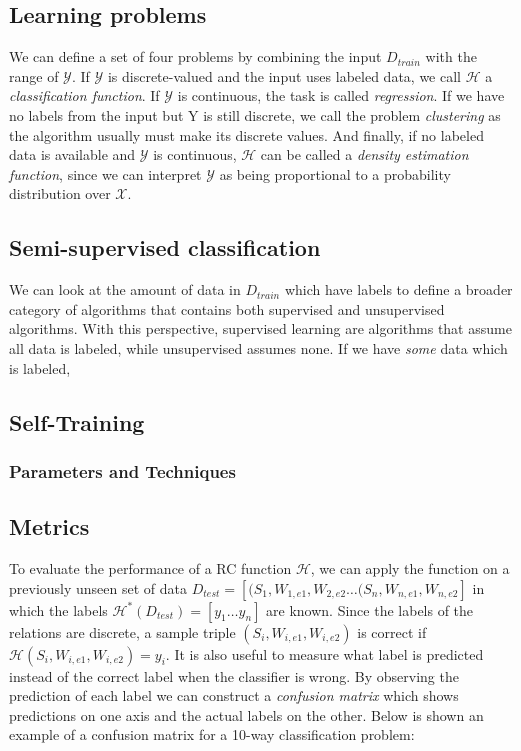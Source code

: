 \subsection{Learning problems}

We can define a set of four problems by combining the input $D_{train}$ with the range of $\mathcal{Y}$. If $\mathcal{Y}$ is discrete-valued and the input uses labeled data, we call $\mathcal{H}$ a \emph{classification function}. If $\mathcal{Y}$ is continuous, the task is called \emph{regression}. If we have no labels from the input but Y is still discrete, we call the problem \emph{clustering} as the algorithm usually must make its discrete values. And finally, if no labeled data is available and $\mathcal{Y}$ is continuous, $\mathcal{H}$ can be called a \emph{density estimation function}, since we can interpret $\mathcal{Y}$ as being proportional to a probability distribution over $\mathcal{X}$.

\subsection{Semi-supervised classification}

We can look at the amount of data in $D_{train}$ which have labels to define a broader category of algorithms that contains both supervised and unsupervised algorithms. With this perspective, supervised learning are algorithms that assume all data is labeled, while unsupervised assumes none. If we have \emph{some} data which is labeled,    


\subsection{Self-Training}

\subsubsection{Parameters and Techniques}

\subsection{Metrics}

To evaluate the performance of a RC function $\mathcal{H}$, we can apply the function on a previously unseen set of data $D_{test} = [(S_1, W_{1,e1}, W_{2,e2} \ldots (S_n, W_{n,e1}, W_{n,e2}]$ in which the labels $\mathcal{H}^*(D_{test}) = [y_1 \ldots y_n]$ are known. Since the labels of the relations are discrete, a sample triple $(S_i,W_{i,e1},W_{i,e2})$ is correct if $\mathcal{H}(S_i,W_{i,e1},W_{i,e2}) = y_i$. 
It is also useful to measure what label is predicted instead of the correct label when the classifier is wrong.
By observing the prediction of each label we can construct a \emph{confusion matrix} which shows predictions on one axis and the actual labels on the other. Below is shown an example of a confusion matrix for a 10-way classification problem:

